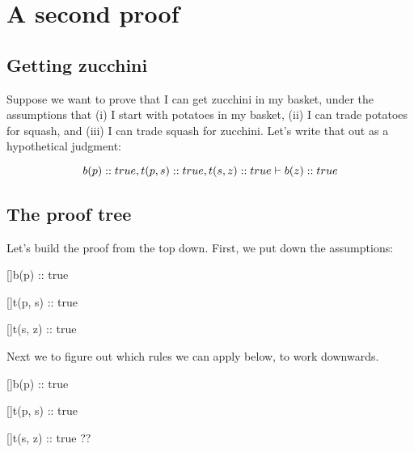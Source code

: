 \documentclass[../../../main.tex]{subfiles}
\begin{document}
\chapter{A second proof}


\section{Getting zucchini}

Suppose we want to prove that I can get zucchini in my basket, under the assumptions that (i) I start with potatoes in my basket, (ii) I can trade potatoes for squash, and (iii) I can trade squash for zucchini. Let's write that out as a hypothetical judgment:

\begin{equation*}
  b(p) :: true, t(p, s) :: true, t(s, z) :: true \ndturnstile/ b(z) :: true
\end{equation*}


\section{The proof tree}

Let's build the proof from the top down. First, we put down the assumptions:

\begin{prooftree*}
  \hypo{}
  []{b(p) :: true}

  \hypo{}
  []{t(p, s) :: true}
  
  \hypo{}
  []{t(s, z) :: true}
  
  
\end{prooftree*}

\noindent
Next we to figure out which rules we can apply below, to work downwards. 

\begin{prooftree*}
  \hypo{}
  []{b(p) :: true}
  \ellipsis{}{}

  \hypo{}
  []{t(p, s) :: true}
  \ellipsis{}{}
  
  \hypo{}
  []{t(s, z) :: true}
  \ellipsis{}{}
  ??
  
  
\end{prooftree*}
\end{document}
